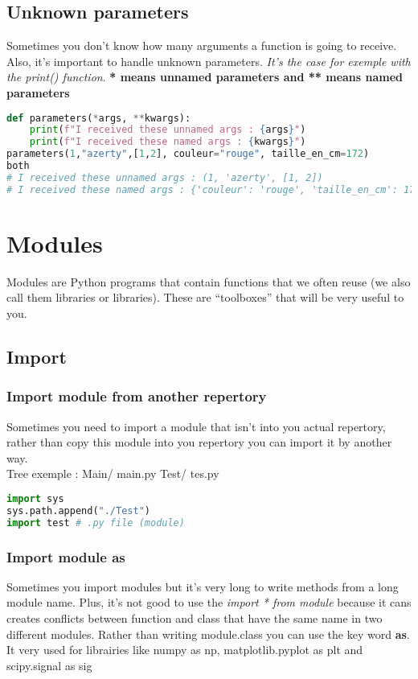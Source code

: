 \documentclass[a4paper, 12pt]{article}
\begin{document}
\subsection{Unknown parameters}
Sometimes you don't know how many arguments a function is going to receive. Also, it's important to handle unknown parameters. \textit{It's the case for exemple with the print() function}. \textbf{* means unnamed parameters and ** means named parameters}
\begin{lstlisting}[language=Python]
def parameters(*args, **kwargs):
	print(f"I received these unnamed args : {args}")
	print(f"I received these named args : {kwargs}")
parameters(1,"azerty",[1,2], couleur="rouge", taille_en_cm=172)
both
# I received these unnamed args : (1, 'azerty', [1, 2])
# I received these named args : {'couleur': 'rouge', 'taille_en_cm': 172}
\end{lstlisting}

\newpage
\section{Modules}
Modules are Python programs that contain functions that we often reuse (we also call them libraries or libraries). These are “toolboxes” that will be very useful to you.\newline

\subsection{Import}
\label{subsec:Import}
\subsubsection{Import module from another repertory}
Sometimes you need to import a module that isn't into you actual repertory, rather than copy this module into you repertory you can import it by another way. \\

Tree exemple :
Main/
	main.py
	Test/
		tes.py

\begin{lstlisting}[language=Python]
import sys
sys.path.append("./Test")
import test # .py file (module)
\end{lstlisting}

\subsubsection{Import module as}
Sometimes you import modules but it's very long to write methods from a long module name. Plus, it's not good to use the \textit{import * from module} because it cans creates conflicts between function and class that have the same name in two different modules. Rather than writing module.class you can use the key word \textbf{as}. It very used for librairies like numpy as np, matplotlib.pyplot as plt and scipy.signal as sig
\label{As}
\end{document}
